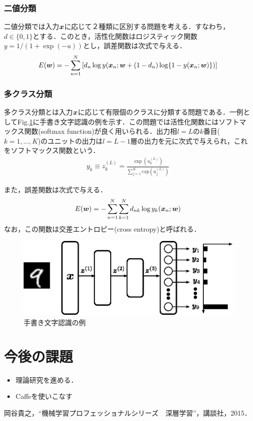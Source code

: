 \documentclass[a4paper,10pt]{jsarticle}
\def\vec#1{\mbox{\boldmath$#1$}}
\begin{document}
\subsubsection{二値分類}
二値分類では入力$\vec{x}$に応じて２種類に区別する問題を考える．すなわち，$d\in\{0,1\}$とする．このとき，活性化関数はロジスティック関数$y=1/(1+\exp(-u))$とし，誤差関数は次式で与える．
\begin{eqnarray}
 E(\vec{w})=-\sum^{N}_{n=1}\left[d_{n}\log y(\vec{x}_{n};\vec{w} + (1-d_{n})\log\{1-y(\vec{x}_{n};\vec{w})\})\right]\label{000654_27Jun15}
\end{eqnarray}

\subsubsection{多クラス分類}
多クラス分類とは入力$\vec{x}$に応じて有限個のクラスに分類する問題である．一例としてFig.\ref{010714_27Jun15}に手書き文字認識の例を示す．この問題では活性化関数にはソフトマックス関数(softmax function)が良く用いられる．出力相$l=L$の$k$番目($k=1,...,K$)のユニットの出力は$l=L-1$層の出力を元に次式で与えられ，これをソフトマックス関数という．
\begin{eqnarray}
 y_{k} \equiv z_{k}^{(L)}= \frac{\exp(u_{k}^{(L)})}{\sum^{K}_{j=1}exp(u_{j}^{(L)})}
\end{eqnarray}

また，誤差関数は次式で与える．
\begin{eqnarray}
 E(\vec{w})=-\sum^{N}_{n=1}\sum^{N}_{k=1}d_{nk}\log y_{k}(\vec{x}_{n};\vec{w})\label{000700_27Jun15}
\end{eqnarray}
なお，この関数は交差エントロピー(cross entropy)と呼ばれる．

\begin{figure}[htbp]
 	\centering
	\includegraphics[width=12cm]{./fig/eps/example_digits.eps}
	\caption{手書き文字認識の例}
	\label{010714_27Jun15}
\end{figure}

\section{今後の課題}
\begin{itemize}
 \item 理論研究を進める．
 \item Caffeを使いこなす
\end{itemize}

\begin{thebibliography}{99}
  岡谷貴之，``機械学習プロフェッショナルシリーズ　深層学習''，講談社，2015．
 \end{thebibliography}
\end{document}
